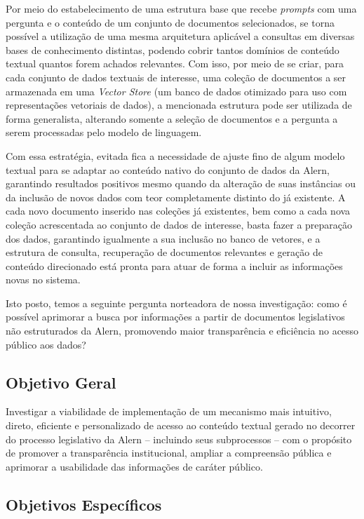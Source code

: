Por meio do estabelecimento de uma estrutura base que recebe \textit{prompts} com uma pergunta e o conteúdo de um conjunto de documentos selecionados, se torna possível a utilização de uma mesma arquitetura aplicável a consultas em diversas bases de conhecimento distintas, podendo cobrir tantos domínios de conteúdo textual quantos forem achados relevantes. Com isso, por meio de se criar, para cada conjunto de dados textuais de interesse, uma coleção de documentos a ser armazenada em uma \textit{Vector Store} (um banco de dados otimizado para uso com representações vetoriais de dados), a mencionada estrutura pode ser utilizada de forma generalista, alterando somente a seleção de documentos e a pergunta a serem processadas pelo modelo de linguagem. 

Com essa estratégia, evitada fica a necessidade de ajuste fino de algum modelo textual para se adaptar ao conteúdo nativo do conjunto de dados da \ac{Alern}, garantindo resultados positivos mesmo quando da alteração de suas instâncias ou da inclusão de novos dados com teor completamente distinto do já existente. A cada novo documento inserido nas coleções já existentes, bem como a cada nova coleção acrescentada ao conjunto de dados de interesse, basta fazer a preparação dos dados, garantindo igualmente a sua inclusão no banco de vetores, e a estrutura de consulta, recuperação de documentos relevantes e geração de conteúdo direcionado está pronta para atuar de forma a incluir as informações novas no sistema.

Isto posto, temos a seguinte pergunta norteadora de nossa investigação: como é possível aprimorar a busca por informações a partir de documentos legislativos não estruturados da \ac{Alern}, promovendo maior transparência e eficiência no acesso público aos dados?

\subsection{Objetivo Geral}
\label{subsec:Introducao.1.1}

Investigar a viabilidade de implementação de um mecanismo mais intuitivo, direto, eficiente e personalizado de acesso ao conteúdo textual gerado no decorrer do processo legislativo da \ac{Alern} -- incluindo seus subprocessos -- com o propósito de promover a transparência institucional, ampliar a compreensão pública e aprimorar a usabilidade das informações de caráter público.

\subsection{Objetivos Específicos}
\label{subsec:Introducao.1.2}

